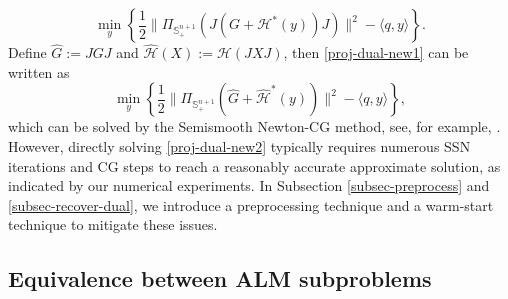 \documentclass[11pt]{article}
\theoremstyle{plain}
\def\H{\mathcal{H}}
\def\S{\mathbb{S}}
\begin{document}
\begin{equation}\label{proj-dual-new1}
 \min_y\left\{ \frac{1}{2}\|\Pi_{\S^{n+1}_+}(J(G+\H^*(y))J)\|^2-\langle q,y\rangle \right\}.
 \end{equation}
 Define $\widehat{G}:=JGJ$ and $\widehat{\H} (X):=\H(JXJ)$, then \eqref{proj-dual-new1} can be written as
\begin{equation}\label{proj-dual-new2}
 \min_y\left\{ \frac{1}{2}\|\Pi_{\S^{n+1}_+}(\widehat{G}+\widehat{\H}^*(y))\|^2-\langle q,y\rangle \right\},
 \end{equation}
 which can be solved by the Semismooth Newton-CG method, see, for example, \cite{qi2006quadratically,SDPNAL}. However, directly solving \eqref{proj-dual-new2} typically requires numerous SSN iterations and CG steps to reach 
 a reasonably accurate approximate solution, as indicated by our numerical experiments. In Subsection \ref{subsec-preprocess} and \ref{subsec-recover-dual}, we introduce a preprocessing technique and a warm-start technique to mitigate these issues.


\subsection{Equivalence between ALM subproblems}\label{subsec-alg-equivalence}
\end{document}
